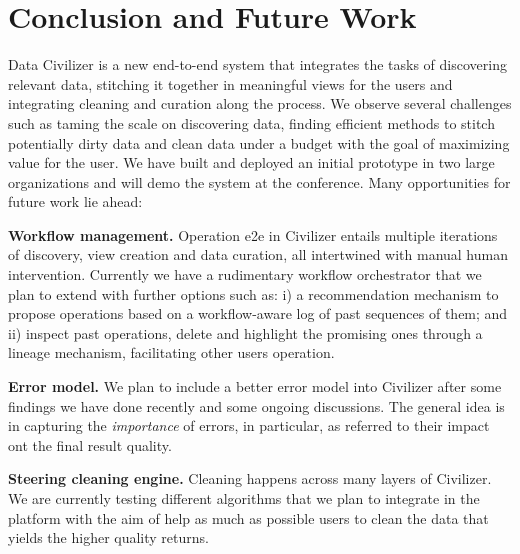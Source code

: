 \section{Conclusion and Future Work}
\label{sec:conclusion}


Data Civilizer is a new end-to-end system that integrates the tasks of
discovering relevant data, stitching it together in meaningful views for the
users and integrating cleaning and curation along the process. We observe
several challenges such as taming the scale on discovering data, finding
efficient methods to stitch potentially dirty data and clean data under a budget
with the goal of maximizing value for the user. We have built and deployed an
initial prototype in two large organizations and will demo the system at the
conference. Many opportunities for future work lie ahead:

\begin{myitemize}
\item\textbf{Workflow management.} Operation e2e in Civilizer entails multiple
iterations of discovery, view creation and data curation, all intertwined with
manual human intervention. Currently we have a rudimentary workflow orchestrator
that we plan to extend with further options such as: i) a recommendation mechanism
to propose operations based on a workflow-aware log of past sequences of them;
and ii) inspect past operations, delete and highlight the promising ones through a
lineage mechanism, facilitating other users operation. 
\item\textbf{Error model.} We plan to include a better error model into
Civilizer after some findings we have done recently \cite{datacleaning} and some
ongoing discussions. The general idea is in capturing the \emph{importance} of
errors, in particular, as referred to their impact ont the final result quality.
\item\textbf{Steering cleaning engine.} Cleaning happens across many layers of
Civilizer. We are currently testing different algorithms that we plan to
integrate in the platform with the aim of help as much as possible users to
clean the data that yields the higher quality returns.
\end{myitemize}

